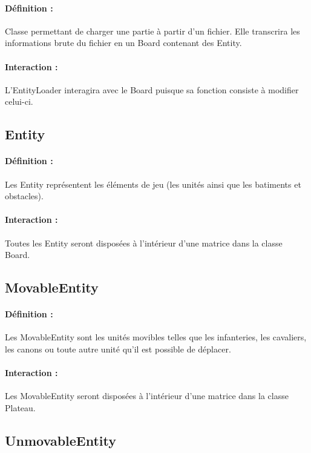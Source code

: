 			\paragraph{Définition :}
			Classe permettant de charger une partie à partir d'un fichier. Elle transcrira les informations brute du 
			fichier en un Board contenant des Entity.
			\paragraph{Interaction :}
			L'EntityLoader interagira avec le Board puisque sa fonction consiste à modifier celui-ci.

		\subsection*{Entity}

			\paragraph{Définition :}
			Les Entity représentent les éléments de jeu (les unités ainsi que les batiments et obstacles).
			\paragraph{Interaction :}
			Toutes les Entity seront disposées à l'intérieur d'une matrice dans la classe Board.

		\subsection*{MovableEntity}

			\paragraph{Définition :}
			Les MovableEntity sont les unités movibles telles que les infanteries, les cavaliers, les canons ou toute autre unité 
			qu'il est possible de déplacer.
			\paragraph{Interaction :}
			Les MovableEntity seront disposées à l'intérieur d'une matrice dans la classe Plateau.

		\subsection*{UnmovableEntity}

